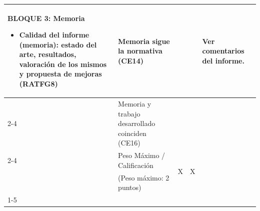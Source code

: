 \begin{landscape}
\begin{table}[ht]
\begin{tabularx}{\linewidth}{|p{7cm}|p{9cm}|p{1cm}|p{1cm}|p{5cm}|}
  \multirow{4}{=}{
  \begin{minipage}[t]{7cm}
    \vspace{-5mm}
    \textbf{BLOQUE 3: Memoria}
    \begin{itemize}[left=5pt, itemsep=1pt, topsep=1pt]
      \item Calidad del informe (memoria): estado del arte, resultados, valoración de los mismos y propuesta de mejoras (RATFG8)
    \end{itemize}
  \end{minipage}}
    & Memoria sigue la normativa (CE14) &  &  &  \multirow[c]{4}{=}{\centering \footnotesize Ver comentarios del informe.} \\ \cline{2-4}
    & Memoria y trabajo desarrollado coinciden (CE16) &  &  &  \\ \cline{2-4}
    & \cellcolor[HTML]{C0C0C0}Peso Máximo / Calificación & \multirow[c]{2}{=}{\centering X} & \multirow[c]{2}{=}{\centering X} &  \\
    & \cellcolor[HTML]{C0C0C0}(Peso máximo: 2 puntos) &  &  &  \\ \cline{1-5}
\end{tabularx}
\label{tab:evaluacion_tfg}

\end{table}

\end{landscape}
